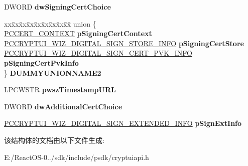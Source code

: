 \begin{DoxyCompactItemize}
\begin{tabbing}
\end{tabbing}\item 
\mbox{\label{struct___c_r_y_p_t_u_i___w_i_z___d_i_g_i_t_a_l___s_i_g_n___i_n_f_o_a2c415d2beb85d4b36d5c473b13a90d55}} 
D\+W\+O\+RD {\bfseries dw\+Signing\+Cert\+Choice}
\item 
\mbox{\label{struct___c_r_y_p_t_u_i___w_i_z___d_i_g_i_t_a_l___s_i_g_n___i_n_f_o_acb8e865222f2d0fdedc1192e08c4a8f3}} 
\begin{tabbing}
xx\=xx\=xx\=xx\=xx\=xx\=xx\=xx\=xx\=\kill
union \{\\
\>\hyperlink{struct___c_e_r_t___c_o_n_t_e_x_t}{PCCERT\_CONTEXT} {\bfseries pSigningCertContext}\\
\>\hyperlink{struct___c_r_y_p_t_u_i___w_i_z___d_i_g_i_t_a_l___s_i_g_n___s_t_o_r_e___i_n_f_o}{PCCRYPTUI\_WIZ\_DIGITAL\_SIGN\_STORE\_INFO} {\bfseries pSigningCertStore}\\
\>\hyperlink{struct___c_r_y_p_t_u_i___w_i_z___d_i_g_i_t_a_l___s_i_g_n___c_e_r_t___p_v_k___i_n_f_o}{PCCRYPTUI\_WIZ\_DIGITAL\_SIGN\_CERT\_PVK\_INFO} {\bfseries pSigningCertPvkInfo}\\
\} {\bfseries DUMMYUNIONNAME2}\\

\end{tabbing}\item 
\mbox{\label{struct___c_r_y_p_t_u_i___w_i_z___d_i_g_i_t_a_l___s_i_g_n___i_n_f_o_a11327b00f1f4618f034f9fe55a5cf146}} 
L\+P\+C\+W\+S\+TR {\bfseries pwsz\+Timestamp\+U\+RL}
\item 
\mbox{\label{struct___c_r_y_p_t_u_i___w_i_z___d_i_g_i_t_a_l___s_i_g_n___i_n_f_o_a4bf4ee4a4076890764eba55bdb837e6b}} 
D\+W\+O\+RD {\bfseries dw\+Additional\+Cert\+Choice}
\item 
\mbox{\label{struct___c_r_y_p_t_u_i___w_i_z___d_i_g_i_t_a_l___s_i_g_n___i_n_f_o_a5d40d239d3b9e3b2cd89cfa8387226b0}} 
\hyperlink{struct___c_r_y_p_t_u_i___w_i_z___d_i_g_i_t_a_l___s_i_g_n___e_x_t_e_n_d_e_d___i_n_f_o}{P\+C\+C\+R\+Y\+P\+T\+U\+I\+\_\+\+W\+I\+Z\+\_\+\+D\+I\+G\+I\+T\+A\+L\+\_\+\+S\+I\+G\+N\+\_\+\+E\+X\+T\+E\+N\+D\+E\+D\+\_\+\+I\+N\+FO} {\bfseries p\+Sign\+Ext\+Info}
\end{DoxyCompactItemize}


该结构体的文档由以下文件生成\+:\begin{DoxyCompactItemize}
\item 
E\+:/\+React\+O\+S-\/0../sdk/include/psdk/cryptuiapi.\+h\end{DoxyCompactItemize}
